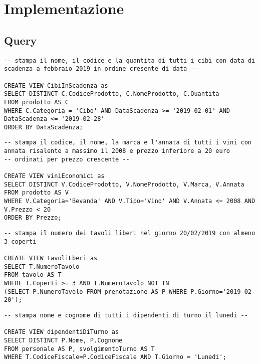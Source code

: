 \section{Implementazione}
\subsection{Query} %
\begin{lstlisting}[title=Operazione 9, style=mysqlStyle] 
-- stampa il nome, il codice e la quantita di tutti i cibi con data di scadenza a febbraio 2019 in ordine cresente di data --

CREATE VIEW CibiInScadenza as
SELECT DISTINCT C.CodiceProdotto, C.NomeProdotto, C.Quantita
FROM prodotto AS C
WHERE C.Categoria = 'Cibo' AND DataScadenza >= '2019-02-01' AND DataScadenza <= '2019-02-28'
ORDER BY DataScadenza;
\end{lstlisting}

\begin{lstlisting}[title=Operazione 10, style=mysqlStyle]
-- stampa il codice, il nome, la marca e l'annata di tutti i vini con annata risalente a massimo il 2008 e prezzo inferiore a 20 euro
-- ordinati per prezzo crescente --

CREATE VIEW viniEconomici as
SELECT DISTINCT V.CodiceProdotto, V.NomeProdotto, V.Marca, V.Annata
FROM prodotto AS V
WHERE V.Categoria='Bevanda' AND V.Tipo='Vino' AND V.Annata <= 2008 AND V.Prezzo < 20
ORDER BY Prezzo;
\end{lstlisting}

\begin{lstlisting}[title=Operazione 11, style=mysqlStyle]
-- stampa il numero dei tavoli liberi nel giorno 20/02/2019 con almeno 3 coperti 

CREATE VIEW tavoliLberi as
SELECT T.NumeroTavolo
FROM tavolo AS T
WHERE T.Coperti >= 3 AND T.NumeroTavolo NOT IN 
(SELECT P.NumeroTavolo FROM prenotazione AS P WHERE P.Giorno='2019-02-20');
\end{lstlisting}

\begin{lstlisting}[title=Operazione 12, style=mysqlStyle]
-- stampa nome e cognome di tutti i dipendenti di turno il lunedi --

CREATE VIEW dipendentiDiTurno as
SELECT DISTINCT P.Nome, P.Cognome
FROM personale AS P, svolgimentoTurno AS T
WHERE T.CodiceFiscale=P.CodiceFiscale AND T.Giorno = 'Lunedi';
\end{lstlisting}

